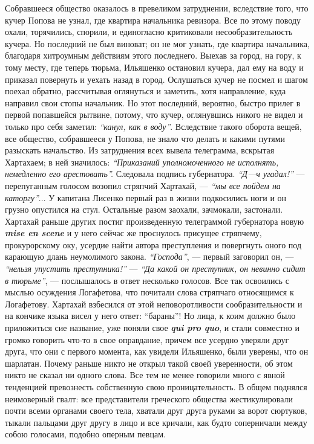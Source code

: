 \documentclass[a4paper,20pt]{report}
\begin{document}
Собравшееся общество оказалось в превеликом затруднении, вследствие того, 
что кучер Попова не узнал, где квартира начальника ревизора. Все по этому поводу охали,
торячились, спорили, и единогласно критиковали несообразительность кучера. 
Но последний не был виноват; он не мог
узнать, где квартира начальника, благодаря хитроумным действиям этого последнего. Выехав за город, на
гору, к тому месту, где теперь тюрьма, Ильяшенко остановил кучера, 
дал ему на воду и приказал повернуть
и уехать назад в город. Ослушаться кучер не посмел
и шагом поехал обратно, рассчитывая оглянуться и заметить,
хотя направление, куда направил свои стопы начальник. 
Но этот последний, вероятно, быстро прилег в
первой попавшейся рытвине, потому, что кучер, оглянувшись
никого не видел и только про себя заметил:
\emph{``канул, как в воду''}. Вследствие такого оборота вещей, все общество, 
собравшееся у Попова, не знало что делать и какими
путями разыскать начальство. Из затруднения всех вывела телеграмма, вскрытая Хартахаем;
в ней значилось: 
\emph{``Приказаний уполномоченного не исполнять, немедленно его арестовать''.}
Следовала подпись губернатора. \emph{``Д—ч угадал!''} —
перепуганным голосом возопил стряпчий Хартахай, — \emph{``мы
все пойдем на каторгу''}... У капитана Лисенко первый
раз в жизни подкосились ноги и он грузно опустился
на стул. Остальные разом заохали, зачмокали, застонали.
Хартахай раньше других постиг произведенную телеграммой губернатора новую \textbf{\em mise en scene} 
и у него сейчас же проснулось присущее стряпчему, прокурорскому оку,
усердие найти автора преступления и повергнуть оного под
карающую длань неумолимого закона. \emph{``Господа''}, — первый
заговорил он, — \emph{``нельзя упустить преступника!''} — \emph{``Да какой он преступник, он невинно сидит в тюрьме''}, —
послышалось в ответ несколько голосов. Все так освоились с мыслью осуждения Логафетова, что почитали слова
стряпчаго относящимся к Логафетову. Хартахай взбесился от этой
неповоротливости сообразительности и на кончике языка висел у него ответ:
``бараны''! Но лица, к коим должно было приложиться сие название, уже поняли
свое \textbf{\em qui pro quo}, и стали совместно и громко говорить что-то в
свое оправдание, причем все усердно уверяли друг друга, что они с первого
момента, как увидели Ильяшенко, были уверены, что он шарлатан.  Почему раньше
никто не открыл такой своей уверенности, об этом никто не сказал ни одного
слова.  Все тем не менее говорили много с явной тенденцией превознесть
собственную свою проницательность.  В общем поднялся неимоверный гвалт: все
представители греческого общества жестикулировали почти всеми органами своего
тела, хватали друг друга руками за ворот сюртуков, тыкали пальцами друг другу в
лицо и все кричали, как будто соперничали между собою голосами, подобно оперным
певцам.
\end{document}
